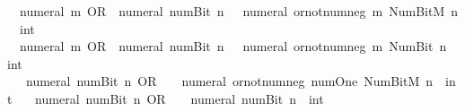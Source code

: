\begin{isabellebody}
\ \ {\isacartoucheopen}numeral\ m\ OR\ {\isacharminus}{\kern0pt}\ {\isacharparenleft}{\kern0pt}numeral\ {\isacharparenleft}{\kern0pt}num{\isachardot}{\kern0pt}Bit{}\ n{\isacharparenright}{\kern0pt}{\isacharparenright}{\kern0pt}\ {\isacharequal}{\kern0pt}\ {\isacharminus}{\kern0pt}\ {\isacharparenleft}{\kern0pt}numeral\ {\isacharparenleft}{\kern0pt}or{\isacharunderscore}{\kern0pt}not{\isacharunderscore}{\kern0pt}num{\isacharunderscore}{\kern0pt}neg\ m\ {\isacharparenleft}{\kern0pt}Num{\isachardot}{\kern0pt}BitM\ n{\isacharparenright}{\kern0pt}{\isacharparenright}{\kern0pt}\ {\isacharcolon}{\kern0pt}{\isacharcolon}{\kern0pt}\ int{\isacharparenright}{\kern0pt}{\isacartoucheclose}\isanewline
\ \ {\isacartoucheopen}numeral\ m\ OR\ {\isacharminus}{\kern0pt}\ {\isacharparenleft}{\kern0pt}numeral\ {\isacharparenleft}{\kern0pt}num{\isachardot}{\kern0pt}Bit{}\ n{\isacharparenright}{\kern0pt}{\isacharparenright}{\kern0pt}\ {\isacharequal}{\kern0pt}\ {\isacharminus}{\kern0pt}\ {\isacharparenleft}{\kern0pt}numeral\ {\isacharparenleft}{\kern0pt}or{\isacharunderscore}{\kern0pt}not{\isacharunderscore}{\kern0pt}num{\isacharunderscore}{\kern0pt}neg\ m\ {\isacharparenleft}{\kern0pt}Num{\isachardot}{\kern0pt}Bit{}\ n{\isacharparenright}{\kern0pt}{\isacharparenright}{\kern0pt}\ {\isacharcolon}{\kern0pt}{\isacharcolon}{\kern0pt}\ int{\isacharparenright}{\kern0pt}{\isacartoucheclose}\isanewline
\ \ {\isacartoucheopen}{\isacharminus}{\kern0pt}\ {\isacharparenleft}{\kern0pt}numeral\ {\isacharparenleft}{\kern0pt}num{\isachardot}{\kern0pt}Bit{}\ n{\isacharparenright}{\kern0pt}{\isacharparenright}{\kern0pt}\ OR\ {}\ {\isacharequal}{\kern0pt}\ {\isacharminus}{\kern0pt}\ {\isacharparenleft}{\kern0pt}numeral\ {\isacharparenleft}{\kern0pt}or{\isacharunderscore}{\kern0pt}not{\isacharunderscore}{\kern0pt}num{\isacharunderscore}{\kern0pt}neg\ num{\isachardot}{\kern0pt}One\ {\isacharparenleft}{\kern0pt}Num{\isachardot}{\kern0pt}BitM\ n{\isacharparenright}{\kern0pt}{\isacharparenright}{\kern0pt}\ {\isacharcolon}{\kern0pt}{\isacharcolon}{\kern0pt}\ int{\isacharparenright}{\kern0pt}{\isacartoucheclose}\isanewline
\ \ {\isacartoucheopen}{\isacharminus}{\kern0pt}\ {\isacharparenleft}{\kern0pt}numeral\ {\isacharparenleft}{\kern0pt}num{\isachardot}{\kern0pt}Bit{}\ n{\isacharparenright}{\kern0pt}{\isacharparenright}{\kern0pt}\ OR\ {}\ {\isacharequal}{\kern0pt}\ {\isacharminus}{\kern0pt}\ {\isacharparenleft}{\kern0pt}numeral\ {\isacharparenleft}{\kern0pt}num{\isachardot}{\kern0pt}Bit{}\ n{\isacharparenright}{\kern0pt}\ {\isacharcolon}{\kern0pt}{\isacharcolon}{\kern0pt}\ int{\isacharparenright}{\kern0pt}{\isacartoucheclose}\isanewline

\end{isabellebody}
